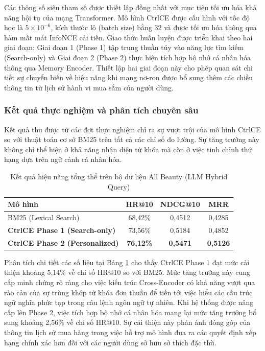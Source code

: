 Các thông số siêu tham số được thiết lập đồng nhất với mục tiêu tối ưu hóa khả năng hội tụ của mạng Transformer. Mô hình CtrlCE được cấu hình với tốc độ học là $5 \times 10^{-6}$, kích thước lô (batch size) bằng 32 và được tối ưu hóa thông qua hàm mất mát InfoNCE cải tiến. Giao thức huấn luyện được triển khai theo hai giai đoạn: Giai đoạn 1 (Phase 1) tập trung thuần túy vào năng lực tìm kiếm (Search-only) và Giai đoạn 2 (Phase 2) thực hiện tích hợp bộ nhớ cá nhân hóa thông qua Memory Encoder. Thiết lập hai giai đoạn này cho phép quan sát chi tiết sự chuyển biến về hiệu năng khi mạng nơ-ron được bổ sung thêm các chiều thông tin từ lịch sử hành vi mua sắm của người dùng.

\subsubsection*{Kết quả thực nghiệm và phân tích chuyên sâu}

Kết quả thu được từ các đợt thực nghiệm chỉ ra sự vượt trội của mô hình CtrlCE so với thuật toán cơ sở BM25 trên tất cả các chỉ số đo lường. Sự tăng trưởng này không chỉ thể hiện ở khả năng nhận diện từ khóa mà còn ở việc tinh chỉnh thứ hạng dựa trên ngữ cảnh cá nhân hóa.

\begin{table}[ht]
\centering
\caption{Kết quả hiệu năng tổng thể trên bộ dữ liệu All Beauty (LLM Hybrid Query)}
\label{tab:llm_overall_results}
\begin{tabular}{|l|c|c|c|}
\hline
\textbf{Mô hình} & \textbf{HR@10} & \textbf{NDCG@10} & \textbf{MRR} \\ \hline
BM25 (Lexical Search) & 68,42\% & 0,4512 & 0,4285 \\ \hline
\textbf{CtrlCE Phase 1 (Search-only)} & 73,56\% & 0,5184 & 0,4852 \\ \hline
\textbf{CtrlCE Phase 2 (Personalized)} & \textbf{76,12\%} & \textbf{0,5471} & \textbf{0,5126} \\ \hline
\end{tabular}
\end{table}

Phân tích chi tiết các số liệu tại Bảng \ref{tab:llm_overall_results} cho thấy CtrlCE Phase 1 đạt mức cải thiện khoảng 5,14\% về chỉ số HR@10 so với BM25. Mức tăng trưởng này cung cấp minh chứng rõ ràng cho việc kiến trúc Cross-Encoder có khả năng vượt qua rào cản của sự trùng khớp từ khóa đơn thuần để tiến tới việc hiểu các cấu trúc ngữ nghĩa phức tạp trong câu lệnh ngôn ngữ tự nhiên. Khi hệ thống được nâng cấp lên Phase 2, việc tích hợp bộ nhớ cá nhân hóa mang lại mức tăng trưởng bổ sung khoảng 2,56\% về chỉ số HR@10. Sự cải thiện này phản ánh đóng góp của thông tin lịch sử mua hàng trong việc hỗ trợ mô hình đưa ra các quyết định xếp hạng chính xác hơn đối với các người dùng sở hữu sở thích đặc thù.

